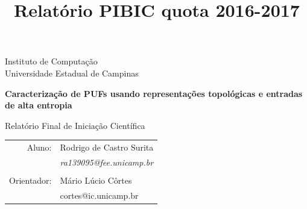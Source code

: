\documentclass[pdftex,11pt]{article}
\title{Relatório PIBIC quota 2016-2017}
\begin{document}
\thispagestyle{empty}


\begin{center}
\Large
Instituto de Computação \\
Universidade Estadual de Campinas

\end{center}


\bigskip
\bigskip
\bigskip

{\LARGE
  \begin{center}
      \textbf{Caracterização de PUFs usando representações
              topológicas e entradas de alta entropia}

    \vspace{1cm}

   Relatório Final de Iniciação Científica
  \end{center}
}

\vfill


\hspace{3cm}
\begin{tabular}{rl}

	Aluno:  & Rodrigo de Castro Surita \\
    		& \emph{ra139095@fee.unicamp.br} \\
    \\

  	Orientador: & Mário Lúcio Côrtes \\
                & cortes@ic.unicamp.br \\

\end{tabular}
        \newpage
\end{document}
